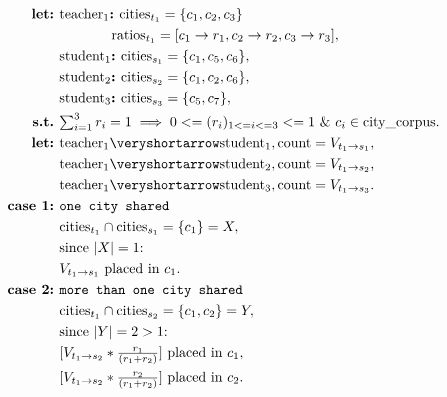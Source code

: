 \documentclass[12pt,english]{article}
\begin{document}
\newpage
\begin{center}
\begin{minipage}{.8\linewidth}
\begin{align}
\textbf{let:\ } & \text{teacher}_{1}\textbf{:\ }  \text{cities}_{t_{1}} = \{ c_{1}, c_{2}, c_{3}\} \\
& \hphantom{aaaaaa..} \text{ratios}_{t_{1}} = [c_{1} \rightarrow r_{1}, c_{2} \rightarrow r_{2}, c_{3} \rightarrow r_{3}], \nonumber\\
 & \text{student}_{1}\textbf{:\ } \text{cities}_{s_{1}} = \{ c_{1}, c_{5}, c_{6}\}, \nonumber \\
 & \text{student}_{2}\textbf{:\ } \text{cities}_{s_{2}} = \{ c_{1}, c_{2}, c_{6}\}, \nonumber \\
 & \text{student}_{3}\textbf{:\ } \text{cities}_{s_{3}} = \{ c_{5}, c_{7}\}, \nonumber \\
\textbf{s.t.\ } &  \textstyle{\sum_{i = 1}^{3}{r_{i} = 1}} \implies
 0 <= (r_{i})_{1 <= i <= 3} <= 1 \text{ \& } c_{i} \in \text{city\_corpus}. \nonumber \\
\textbf{let:\ } & \text{teacher}_{1} \veryshortarrow \text{student}_{1}, \text{count} = V_{t_{1}\rightarrow s_{1}}, \\
& \text{teacher}_{1} \veryshortarrow \text{student}_{2}, \text{count} = V_{t_{1}\rightarrow s_{2}}\text{,}  \nonumber \\
& \text{teacher}_{1} \veryshortarrow \text{student}_{3}, \text{count} = V_{t_{1}\rightarrow s_{3}}.  \nonumber \\
\textbf{case 1}\textbf{:\ }  & \texttt{one city shared} \\
& \text{cities}_{t_{1}} \cap \text{cities}_{s_{1}} = \{c_{1}\} = X, \nonumber \\
& \text{since } |X| = 1 \text{:} \nonumber \\
& V_{t_{1}\rightarrow s_{1}} \text{ placed in } c_{1}.\ \nonumber \\
\textbf{case 2}\textbf{:\ }  & \texttt{more than one city shared} \\
& \text{cities}_{t_{1}} \cap \text{cities}_{s_{2}} = \{c_{1}, c_{2}\} = Y, \nonumber \\
& \text{since } |Y| = 2 > 1 \text{:} \nonumber \\
& \textstyle{[V_{t_{1}\rightarrow s_{2}} * \frac{r_{1}}{(r_{1} + r_{2})}]} \text{ placed in } c_{1},\ \nonumber \\
& \textstyle{[V_{t_{1}\rightarrow s_{2}} * \frac{r_{2}}{(r_{1} + r_{2})}]} \text{ placed in } c_{2}.\ \nonumber \\

\end{align}
\end{minipage}
\end{center}
\end{document}
